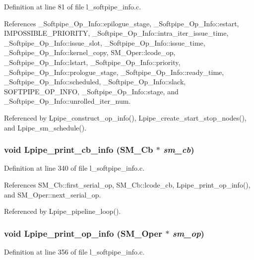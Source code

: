 Definition at line 81 of file l\_\-softpipe\_\-info.c.

References \_\-Softpipe\_\-Op\_\-Info::epilogue\_\-stage, \_\-Softpipe\_\-Op\_\-Info::estart, IMPOSSIBLE\_\-PRIORITY, \_\-Softpipe\_\-Op\_\-Info::intra\_\-iter\_\-issue\_\-time, \_\-Softpipe\_\-Op\_\-Info::issue\_\-slot, \_\-Softpipe\_\-Op\_\-Info::issue\_\-time, \_\-Softpipe\_\-Op\_\-Info::kernel\_\-copy, SM\_\-Oper::lcode\_\-op, \_\-Softpipe\_\-Op\_\-Info::lstart, \_\-Softpipe\_\-Op\_\-Info::priority, \_\-Softpipe\_\-Op\_\-Info::prologue\_\-stage, \_\-Softpipe\_\-Op\_\-Info::ready\_\-time, \_\-Softpipe\_\-Op\_\-Info::scheduled, \_\-Softpipe\_\-Op\_\-Info::slack, SOFTPIPE\_\-OP\_\-INFO, \_\-Softpipe\_\-Op\_\-Info::stage, and \_\-Softpipe\_\-Op\_\-Info::unrolled\_\-iter\_\-num.

Referenced by Lpipe\_\-construct\_\-op\_\-info(), Lpipe\_\-create\_\-start\_\-stop\_\-nodes(), and Lpipe\_\-sm\_\-schedule().
\subsubsection{\setlength{\rightskip}{0pt plus 5cm}void Lpipe\_\-print\_\-cb\_\-info (\bf{SM\_\-Cb} $\ast$ {\em sm\_\-cb})}\label{l__softpipe__info_8c_a5f0f3fb74601d90b6f5de3b32a39a7a}




Definition at line 340 of file l\_\-softpipe\_\-info.c.

References SM\_\-Cb::first\_\-serial\_\-op, SM\_\-Cb::lcode\_\-cb, Lpipe\_\-print\_\-op\_\-info(), and SM\_\-Oper::next\_\-serial\_\-op.

Referenced by Lpipe\_\-pipeline\_\-loop().
\subsubsection{\setlength{\rightskip}{0pt plus 5cm}void Lpipe\_\-print\_\-op\_\-info (\bf{SM\_\-Oper} $\ast$ {\em sm\_\-op})}\label{l__softpipe__info_8c_9f4a4d46b2e2c57f0677ad6e07365afc}




Definition at line 356 of file l\_\-softpipe\_\-info.c.

